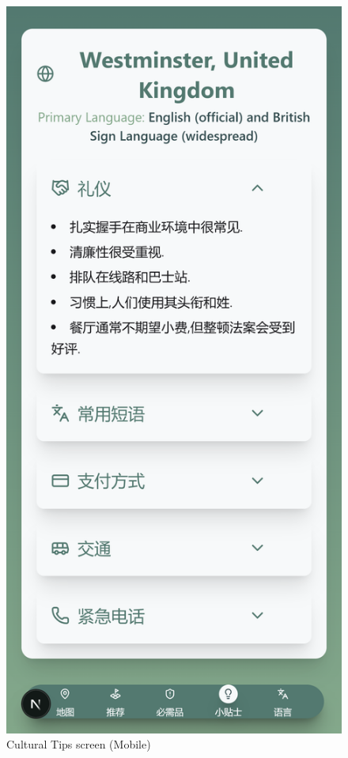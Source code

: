 \begin{figure}[H]
    \centering
    \includegraphics[height=0.3\textheight,keepaspectratio]{images/5_culturaltips_mobile.png}
    \caption{Cultural Tips screen (Mobile)}
\end{figure}

